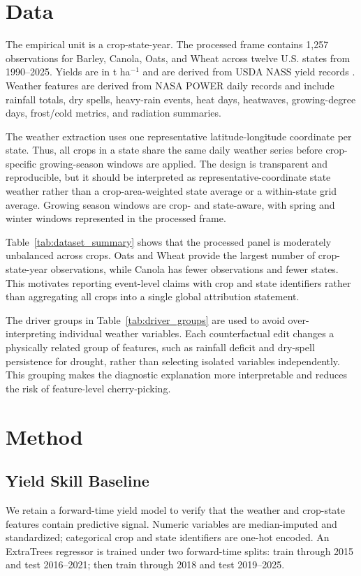 \documentclass[11pt]{article}
\begin{document}
\section{Data}
The empirical unit is a crop-state-year. The processed frame contains 1,257
observations for Barley, Canola, Oats, and Wheat across twelve U.S. states from
1990--2025. Yields are in t ha$^{-1}$ and are derived from USDA NASS yield records
\citep{USDANASSQuickStats}. Weather features are derived from NASA POWER daily records
\citep{NASAPOWER2025} and include rainfall totals, dry spells, heavy-rain events, heat
days, heatwaves, growing-degree days, frost/cold metrics, and radiation summaries.

The weather extraction uses one representative latitude-longitude coordinate per state.
Thus, all crops in a state share the same daily weather series before crop-specific
growing-season windows are applied. The design is transparent and reproducible, but it
should be interpreted as representative-coordinate state weather rather than a
crop-area-weighted state average or a within-state grid average. Growing season windows
are crop- and state-aware, with spring and winter windows represented in the processed
frame.



Table~\ref{tab:dataset_summary} shows that the processed panel is moderately
unbalanced across crops. Oats and Wheat provide the largest number of crop-state-year
observations, while Canola has fewer observations and fewer states. This motivates
reporting event-level claims with crop and state identifiers rather than aggregating
all crops into a single global attribution statement.



The driver groups in Table~\ref{tab:driver_groups} are used to avoid over-interpreting
individual weather variables. Each counterfactual edit changes a physically related
group of features, such as rainfall deficit and dry-spell persistence for drought,
rather than selecting isolated variables independently. This grouping makes the
diagnostic explanation more interpretable and reduces the risk of feature-level
cherry-picking.

\section{Method}
\subsection{Yield Skill Baseline}
We retain a forward-time yield model to verify that the weather and crop-state features
contain predictive signal. Numeric variables are median-imputed and standardized;
categorical crop and state identifiers are one-hot encoded. An ExtraTrees regressor is
trained under two forward-time splits: train through 2015 and test 2016--2021; then
train through 2018 and test 2019--2025.
\end{document}
